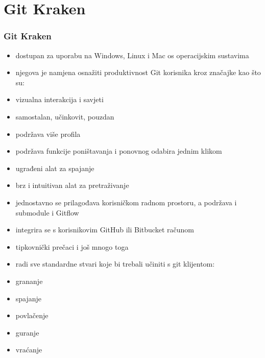 \section{Git Kraken}
\begin{frame}[allowframebreaks]
\frametitle{Git Kraken}
 
\begin{itemize}
 \item dostupan za uporabu na Windows, Linux i Mac os operacijskim sustavima
 \item njegova je namjena osnažiti produktivnost Git korisnika kroz značajke kao što su:
 \item vizualna interakcija i savjeti
 \item samostalan, učinkovit, pouzdan
 \item podržava više profila
 \item podržava funkcije poništavanja i ponovnog odabira jednim klikom
 \item ugrađeni alat za spajanje
 \item brz i intuitivan alat za pretraživanje
 \item jednostavno se prilagođava korisničkom radnom prostoru, a podržava i submodule i Gitflow
 \item integrira se s korisnikovim GitHub ili Bitbucket računom
 \item tipkovnički prečaci i još mnogo toga
 \framebreak
 \item radi sve standardne stvari koje bi trebali učiniti s git klijentom:
 		\item grananje
 		\item spajanje
 		\item povlačenje
 		\item guranje
 		\item vraćanje
\end{itemize}
\end{frame}
